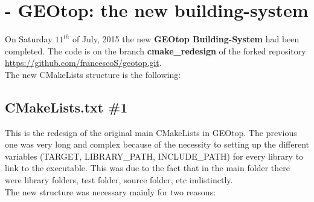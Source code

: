 \section{ - GEOtop: the new building-system}\label{sec:20150714}

On Saturday $11^{th}$ of July, 2015 the new \textbf{GEOtop Building-System} had been completed. The code is on the branch \textbf{cmake\_redesign} of the forked repository \url{https://github.com/francescoS/geotop.git}.\\
The new CMakeLists structure is the following:

\begin{fullwidth}

\end{fullwidth}

\subsection{CMakeLists.txt \#1}

This is the redesign of the original main CMakeLists in GEOtop. The previous one was very long and complex because of the necessity to setting up the different variables (TARGET, LIBRARY\_PATH, INCLUDE\_PATH) for every library to link to the executable. This was due to the fact that in the main folder there were library folders, test folder, source folder, etc indistinctly.\\
The new structure was necessary mainly for two reasons:

